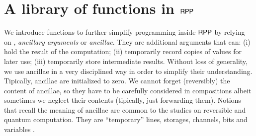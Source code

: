 \section{A library of functions in $ \mathsf{RPP} $}
\label{section:A library of functions in TRRF}


We introduce functions to  further simplify programming inside $\mathsf{RPP}$ by relying on \temporarychannels,
 \emph{ancillary arguments} or \emph{ancillae}.
They are additional arguments that can:
(i) hold the result of the computation;
(ii) temporarily record copies of values for later use;
(iii) temporarily store intermediate results.
Without loss of generality, we use ancillae in a very disciplined way in order to simplify their understanding.
Tipically, ancillae are initialized to zero. We cannot forget (reversibly) the content of ancillae, 
so they have to be carefully considered in compositions albeit sometimes we neglect their contents
(tipically, just forwarding them). 
Notions that recall the meaning of ancillae are common to the studies on reversible and quantum computation. They are
``temporary'' lines, storages, channels, bits and variables \cite{toffoli80lncs}.
